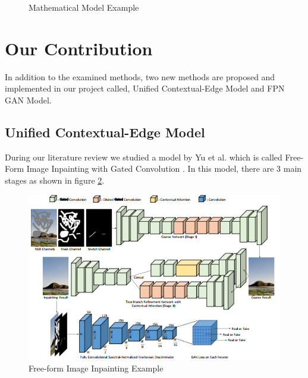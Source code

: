 \begin{figure}[!ht]
        \hspace{0.02\columnwidth}
        \vspace*{3mm}
        \caption{Mathematical Model Example}
    \label{fig:mathmodel}
\end{figure}

\section{Our Contribution}

In addition to the examined methods, two new methods are proposed and implemented in our project called, Unified Contextual-Edge Model and FPN GAN Model.

\subsection{Unified Contextual-Edge Model}
During our literature review we studied a model by Yu et al. which is called Free-Form Image Inpainting with Gated Convolution \cite{freeform_inpainting}. In this model, there are 3 main stages as shown in figure \ref{fig:freeform}.

\begin{figure}[h!]
    \centering
    \includegraphics[scale=0.7]{figures/chapter5/Free-form.PNG}
    \vspace*{3mm}
    \caption{Free-form Image Inpainting Example \cite{freeform_inpainting}}
    \label{fig:freeform}
\end{figure}

